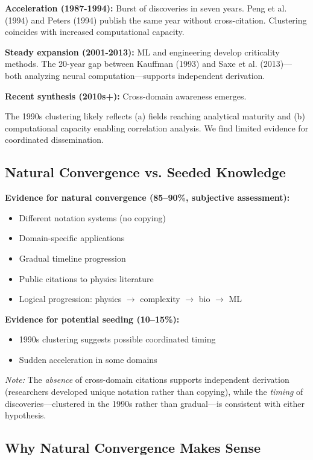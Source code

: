\documentclass[11pt]{article}
\begin{document}
\textbf{Acceleration (1987-1994):} Burst of discoveries in seven years. Peng et al. (1994) and Peters (1994) publish the same year without cross-citation. Clustering coincides with increased computational capacity.

\textbf{Steady expansion (2001-2013):} ML and engineering develop criticality methods. The 20-year gap between Kauffman (1993) and Saxe et al. (2013)---both analyzing neural computation---supports independent derivation.

\textbf{Recent synthesis (2010s+):} Cross-domain awareness emerges.

The 1990s clustering likely reflects (a) fields reaching analytical maturity and (b) computational capacity enabling correlation analysis. We find limited evidence for coordinated dissemination.

\subsection{Natural Convergence vs. Seeded Knowledge}

\textbf{Evidence for natural convergence (85--90\%, subjective assessment):}
\begin{itemize}
    \item Different notation systems (no copying)
    \item Domain-specific applications
    \item Gradual timeline progression
    \item Public citations to physics literature
    \item Logical progression: physics $\to$ complexity $\to$ bio $\to$ ML
\end{itemize}

\textbf{Evidence for potential seeding (10--15\%):}
\begin{itemize}
    \item 1990s clustering suggests possible coordinated timing
    \item Sudden acceleration in some domains
\end{itemize}
\noindent\textit{Note:} The \textit{absence} of cross-domain citations supports independent derivation (researchers developed unique notation rather than copying), while the \textit{timing} of discoveries---clustered in the 1990s rather than gradual---is consistent with either hypothesis.

\subsection{Why Natural Convergence Makes Sense}
\end{document}
